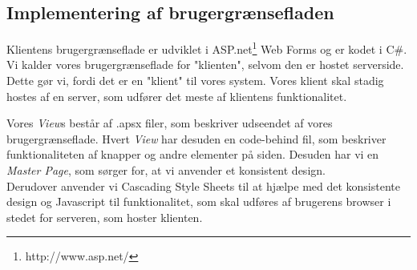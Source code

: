 \subsection*{Implementering af brugergrænsefladen}
\label{Technical_Client_GUI}
Klientens brugergrænseflade er udviklet i ASP.net\footnote{http://www.asp.net/} Web Forms og er kodet i C\#. Vi kalder vores brugergrænseflade for "klienten", selvom den er hostet serverside. Dette gør vi, fordi det er en "klient" til vores system. Vores klient skal stadig hostes af en server, som udfører det meste af klientens funktionalitet.

 Vores \textit{View}s består af .apsx filer, som beskriver udseendet af vores brugergrænseflade. Hvert \textit{View} har desuden en code-behind fil, som beskriver funktionaliteten af knapper og andre elementer på siden. Desuden har vi en \textit{Master Page}, som sørger for, at vi anvender et konsistent design.
\\Derudover anvender vi Cascading Style Sheets til at hjælpe med det konsistente design og Javascript til funktionalitet, som skal udføres af brugerens browser i stedet for serveren, som hoster klienten.